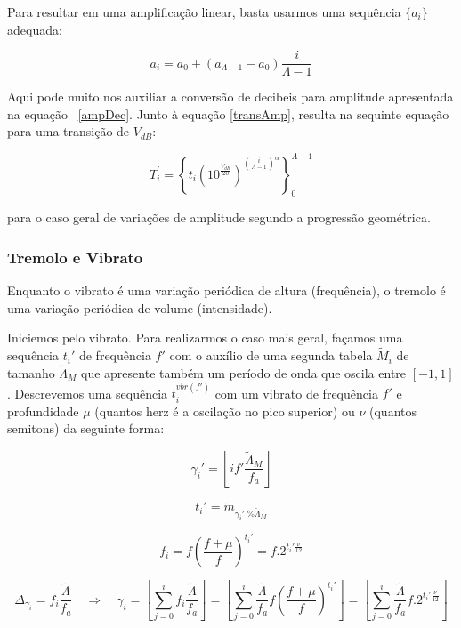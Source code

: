 Para resultar em uma amplificação linear, basta usarmos uma sequência $\{a_i\}$ adequada:

\begin{equation}
a_i=a_0 + (a_{\Lambda-1}-a_0)\frac{i}{\Lambda-1}
\end{equation}

Aqui pode muito nos auxiliar a conversão de decibeis para amplitude apresentada na equação ~\ref{ampDec}.
Junto à equação \ref{transAmp}, resulta na sequinte equação para uma transição de $V_{dB}$:

\begin{equation}
T_i^{'}=\left \{ t_i (10^{\frac{V_{dB}}{20}} )^{\left ( \frac{i}{\Lambda-1} \right )^\alpha} \right \}_0^{\Lambda-1}
\end{equation}

para o caso geral de variações de amplitude segundo a progressão geométrica.


\subsubsection{Tremolo e Vibrato}

Enquanto o vibrato é uma variação periódica de altura (frequência),
o tremolo é uma variação periódica de volume (intensidade).

Iniciemos pelo vibrato. Para realizarmos o caso mais geral, façamos uma sequência $t_i'$
de frequência $f'$ com o auxílio
de uma segunda tabela $\widetilde{M}_i$ de tamanho $\widetilde{\Lambda}_M$ que apresente também
um período de onda que oscila entre $[-1,1]$. Descrevemos uma sequência $t_i^{vbr(f')}$ com
um vibrato de frequência $f'$ e profundidade  $\mu$ (quantos herz é a oscilação no pico superior)
ou $\nu$ (quantos semitons) da seguinte forma:


\begin{equation}\label{vbrGamma}
\gamma_i'=\left \lfloor i f' \frac{\widetilde{\Lambda}_M}{f_a} \right \rfloor
\end{equation}

\begin{equation}\label{vbrAux}
t_i'=\widetilde{m}_{\gamma_i' \;\% \widetilde{\Lambda}_M}
\end{equation}

\begin{equation}\label{vbrF}
f_i=f \left ( \frac{f + \mu }{f} \right )^{t_i'}=f . 2^{t_i'\frac{\nu}{12}}
\end{equation}

\begin{equation}\label{vbrGamma}
\Delta_{\gamma_i}=f_i\frac{\widetilde{\Lambda}}{f_a} \quad \Rightarrow \quad \gamma_i = \left \lfloor \sum_{j=0}^{i} f_i \frac{\widetilde{\Lambda}}{f_a} \right \rfloor = \left \lfloor \sum_{j=0}^{i} \frac{\widetilde{\Lambda}}{f_a}f \left ( \frac{f + \mu }{f} \right )^{t_i'}  \right \rfloor= \left \lfloor \sum_{j=0}^{i} \frac{\widetilde{\Lambda}}{f_a}f . 2^{t_i'\frac{\nu}{12}}  \right \rfloor
\end{equation}

